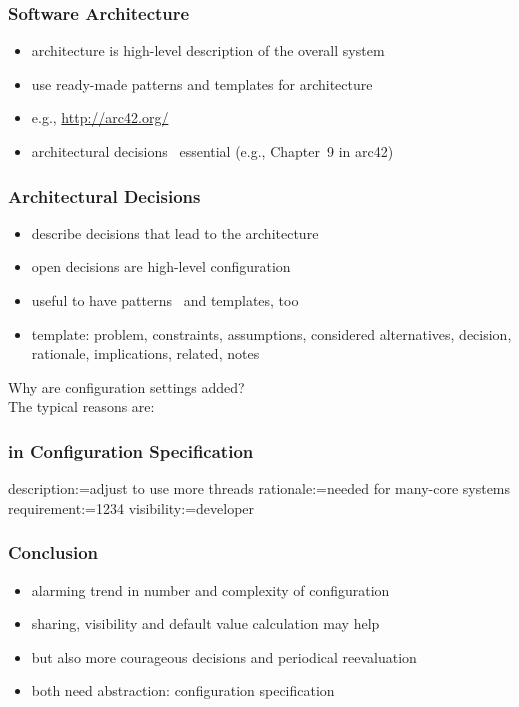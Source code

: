 \begin{frame}
	\frametitle{Software Architecture}
	\begin{itemize}
	\item architecture is high-level description of the overall system
	\item use ready-made patterns and templates for architecture
	\pause
	\item e.g., \url{http://arc42.org/}
	\item architectural decisions~\cite{zdun2007patterns} essential (e.g., Chapter~9 in arc42)
	\end{itemize}
\end{frame}

\begin{frame}
	\frametitle{Architectural Decisions}
	\begin{itemize}
	\item describe decisions that lead to the architecture
	\item open decisions are high-level configuration
	\item useful to have patterns~\cite{zdun2007patterns} and templates, too
	\item template: problem, constraints, assumptions, considered alternatives, decision, rationale, implications, related, notes
	\end{itemize}
\end{frame}

\begin{frame}
	Why are configuration settings added? \\[1cm]
	\pause
	The typical reasons are:
\end{frame}

\begin{frame}[fragile]
	\frametitle{in Configuration Specification}
	\begin{code}
	description:=adjust to use more threads
	rationale:=needed for many-core systems
	requirement:=1234
	visibility:=developer
	\end{code}
\end{frame}

\begin{frame}
	\frametitle{Conclusion}
	\begin{itemize}
	\item alarming trend in number and complexity of configuration
	\item sharing, visibility and default value calculation may help
	\item but also more courageous decisions and periodical reevaluation
	\item both need abstraction: configuration specification
	\end{itemize}
\end{frame}


\nocite{raab2017introducing}

\appendix

\begin{frame}[allowframebreaks]
	
	
\end{frame}




